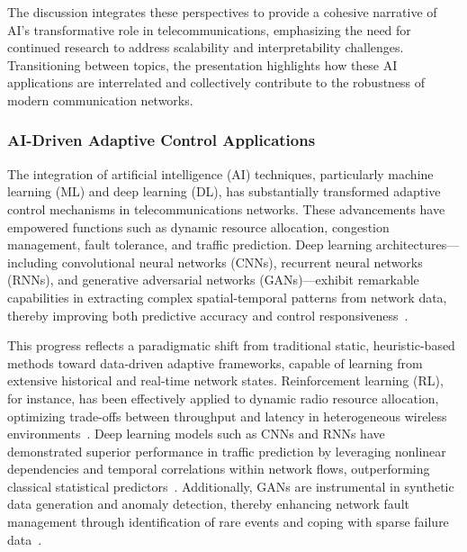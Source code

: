 \documentclass[sigconf]{acmart}
\begin{document}
The discussion integrates these perspectives to provide a cohesive narrative of AI’s transformative role in telecommunications, emphasizing the need for continued research to address scalability and interpretability challenges. Transitioning between topics, the presentation highlights how these AI applications are interrelated and collectively contribute to the robustness of modern communication networks.

\subsubsection{AI-Driven Adaptive Control Applications}

The integration of artificial intelligence (AI) techniques, particularly machine learning (ML) and deep learning (DL), has substantially transformed adaptive control mechanisms in telecommunications networks. These advancements have empowered functions such as dynamic resource allocation, congestion management, fault tolerance, and traffic prediction. Deep learning architectures—including convolutional neural networks (CNNs), recurrent neural networks (RNNs), and generative adversarial networks (GANs)—exhibit remarkable capabilities in extracting complex spatial-temporal patterns from network data, thereby improving both predictive accuracy and control responsiveness~\cite{ref1,ref2,ref3,ref4,ref5,ref6,ref7,ref10,ref11,ref14,ref50}.

This progress reflects a paradigmatic shift from traditional static, heuristic-based methods toward data-driven adaptive frameworks, capable of learning from extensive historical and real-time network states. Reinforcement learning (RL), for instance, has been effectively applied to dynamic radio resource allocation, optimizing trade-offs between throughput and latency in heterogeneous wireless environments~\cite{ref1,ref7}. Deep learning models such as CNNs and RNNs have demonstrated superior performance in traffic prediction by leveraging nonlinear dependencies and temporal correlations within network flows, outperforming classical statistical predictors~\cite{ref2,ref3,ref5}. Additionally, GANs are instrumental in synthetic data generation and anomaly detection, thereby enhancing network fault management through identification of rare events and coping with sparse failure data~\cite{ref6,ref10}.
\end{document}
